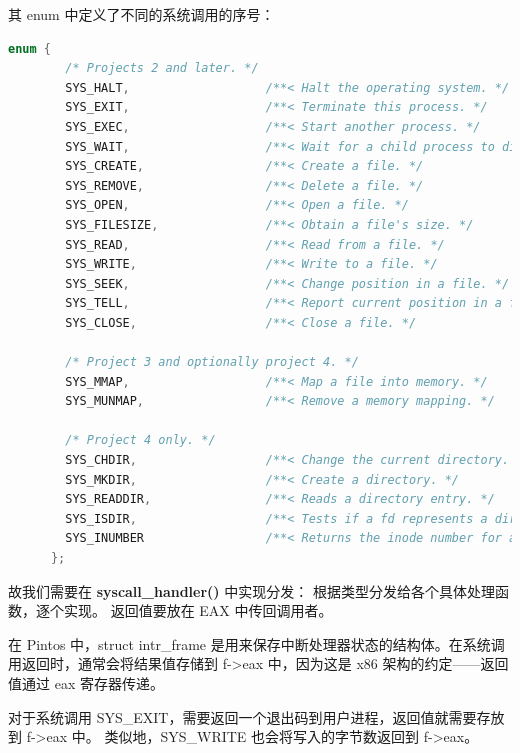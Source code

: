 \documentclass[14pt,a4paper,UTF8,twoside]{article}
\begin{document}
其 enum 中定义了不同的系统调用的序号：

\begin{lstlisting}[language=C, title= syscall.h]
    enum {
        /* Projects 2 and later. */
        SYS_HALT,                   /**< Halt the operating system. */
        SYS_EXIT,                   /**< Terminate this process. */
        SYS_EXEC,                   /**< Start another process. */
        SYS_WAIT,                   /**< Wait for a child process to die. */
        SYS_CREATE,                 /**< Create a file. */
        SYS_REMOVE,                 /**< Delete a file. */
        SYS_OPEN,                   /**< Open a file. */
        SYS_FILESIZE,               /**< Obtain a file's size. */
        SYS_READ,                   /**< Read from a file. */
        SYS_WRITE,                  /**< Write to a file. */
        SYS_SEEK,                   /**< Change position in a file. */
        SYS_TELL,                   /**< Report current position in a file. */
        SYS_CLOSE,                  /**< Close a file. */
    
        /* Project 3 and optionally project 4. */
        SYS_MMAP,                   /**< Map a file into memory. */
        SYS_MUNMAP,                 /**< Remove a memory mapping. */
    
        /* Project 4 only. */
        SYS_CHDIR,                  /**< Change the current directory. */
        SYS_MKDIR,                  /**< Create a directory. */
        SYS_READDIR,                /**< Reads a directory entry. */
        SYS_ISDIR,                  /**< Tests if a fd represents a directory. */
        SYS_INUMBER                 /**< Returns the inode number for a fd. */
      };
\end{lstlisting}

故我们需要在 \textbf{syscall\_handler()} 中实现分发：
根据类型分发给各个具体处理函数，逐个实现。
返回值要放在 EAX 中传回调用者。

\begin{ctt}
    在 Pintos 中，struct intr\_frame 是用来保存中断处理器状态的结构体。在系统调用返回时，通常会将结果值存储到 f->eax 中，因为这是 x86 架构的约定——返回值通过 eax 寄存器传递。
    
    \vspace{0.5cm}

    对于系统调用 SYS\_EXIT，需要返回一个退出码到用户进程，返回值就需要存放到 f->eax 中。
    类似地，SYS\_WRITE 也会将写入的字节数返回到 f->eax。
\end{ctt}
\end{document}
